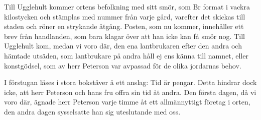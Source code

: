Till Ugglehult kommer ortens befolkning med sitt smör, som
Br format i vackra kilostycken och stämplas med nummer från
varje gård, varefter det skickas till staden och röner en strykande
åtgång. Posten, som nu kommer, innehåller ett brev från
handlanden, som bara klagar över att han icke kan få smör nog.
Till Ugglehult kom, medan vi voro där, den ena lantbrukaren
efter den andra och hämtade utsäden, som lantbrukare på andra
håll ej ens känna till namnet, eller konstgödsel, som av herr
Peterson var avpassad för de olika jordarnas behov.

I förstugan läses i stora bokstäver å ett anslag: Tid är
pengar. Detta hindrar dock icke, att herr Peterson och hans fru
offra sin tid åt andra. Den första dagen, då vi voro där, ägnade
herr Peterson varje timme åt ett allmännyttigt företag i orten,
den andra dagen sysselsatte han sig uteslutande med oss.
